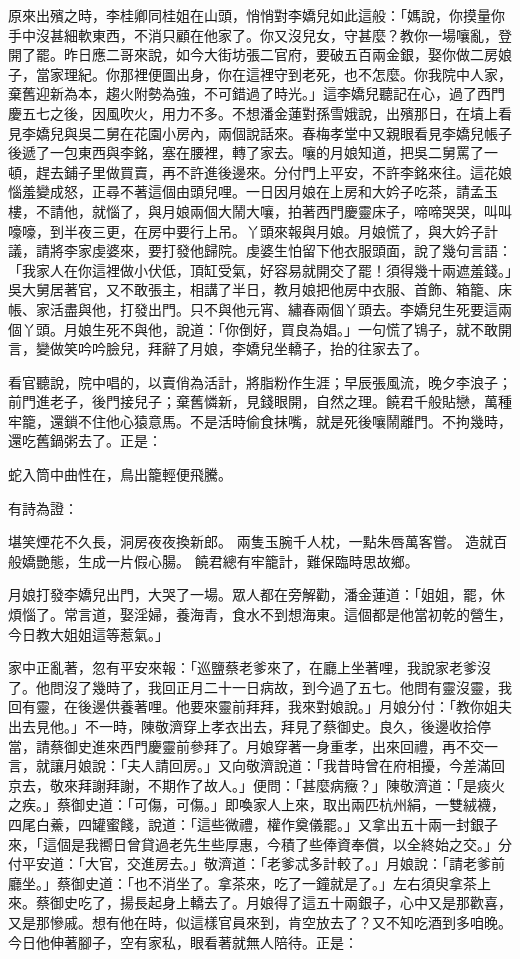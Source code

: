 原來出殯之時，李桂卿同桂姐在山頭，悄悄對李嬌兒如此這般：「媽說，你摸量你手中沒甚細軟東西，不消只顧在他家了。你又沒兒女，守甚麼？教你一場嚷亂，登開了罷。昨日應二哥來說，如今大街坊張二官府，要破五百兩金銀，娶你做二房娘子，當家理紀。你那裡便圖出身，你在這裡守到老死，也不怎麼。你我院中人家，棄舊迎新為本，趨火附勢為強，不可錯過了時光。」這李嬌兒聽記在心，過了西門慶五七之後，因風吹火，用力不多。不想潘金蓮對孫雪娥說，出殯那日，在墳上看見李嬌兒與吳二舅在花園小房內，兩個說話來。春梅孝堂中又親眼看見李嬌兒帳子後遞了一包東西與李銘，塞在腰裡，轉了家去。嚷的月娘知道，把吳二舅罵了一頓，趕去鋪子里做買賣，再不許進後邊來。分付門上平安，不許李銘來往。這花娘惱羞變成怒，正尋不著這個由頭兒哩。一日因月娘在上房和大妗子吃茶，請孟玉樓，不請他，就惱了，與月娘兩個大鬧大嚷，拍著西門慶靈床子，啼啼哭哭，叫叫嚎嚎，到半夜三更，在房中要行上吊。丫頭來報與月娘。月娘慌了，與大妗子計議，請將李家虔婆來，要打發他歸院。虔婆生怕留下他衣服頭面，說了幾句言語：「我家人在你這裡做小伏低，頂缸受氣，好容易就開交了罷！須得幾十兩遮羞錢。」吳大舅居著官，又不敢張主，相講了半日，教月娘把他房中衣服、首飾、箱籠、床帳、家活盡與他，打發出門。只不與他元宵、繡春兩個丫頭去。李嬌兒生死要這兩個丫頭。月娘生死不與他，說道：「你倒好，買良為娼。」一句慌了鴇子，就不敢開言，變做笑吟吟臉兒，拜辭了月娘，李嬌兒坐轎子，抬的往家去了。

看官聽說，院中唱的，以賣俏為活計，將脂粉作生涯；早辰張風流，晚夕李浪子；前門進老子，後門接兒子；棄舊憐新，見錢眼開，自然之理。饒君千般貼戀，萬種牢籠，還鎖不住他心猿意馬。不是活時偷食抹嘴，就是死後嚷鬧離門。不拘幾時，還吃舊鍋粥去了。正是：

蛇入筒中曲性在，鳥出籠輕便飛騰。

有詩為證：

堪笑煙花不久長，洞房夜夜換新郎。
兩隻玉腕千人枕，一點朱唇萬客嘗。
造就百般嬌艷態，生成一片假心腸。
饒君總有牢籠計，難保臨時思故鄉。

月娘打發李嬌兒出門，大哭了一場。眾人都在旁解勸，潘金蓮道：「姐姐，罷，休煩惱了。常言道，娶淫婦，養海青，食水不到想海東。這個都是他當初乾的營生，今日教大姐姐這等惹氣。」

家中正亂著，忽有平安來報：「巡鹽蔡老爹來了，在廳上坐著哩，我說家老爹沒了。他問沒了幾時了，我回正月二十一日病故，到今過了五七。他問有靈沒靈，我回有靈，在後邊供養著哩。他要來靈前拜拜，我來對娘說。」月娘分付：「教你姐夫出去見他。」不一時，陳敬濟穿上孝衣出去，拜見了蔡御史。良久，後邊收拾停當，請蔡御史進來西門慶靈前參拜了。月娘穿著一身重孝，出來回禮，再不交一言，就讓月娘說：「夫人請回房。」又向敬濟說道：「我昔時曾在府相擾，今差滿回京去，敬來拜謝拜謝，不期作了故人。」便問：「甚麼病癥？」陳敬濟道：「是痰火之疾。」蔡御史道：「可傷，可傷。」即喚家人上來，取出兩匹杭州絹，一雙絨襪，四尾白鯗，四罐蜜餞，說道：「這些微禮，權作奠儀罷。」又拿出五十兩一封銀子來，「這個是我嚮日曾貸過老先生些厚惠，今積了些俸資奉償，以全終始之交。」分付平安道：「大官，交進房去。」敬濟道：「老爹忒多計較了。」月娘說：「請老爹前廳坐。」蔡御史道：「也不消坐了。拿茶來，吃了一鐘就是了。」左右須臾拿茶上來。蔡御史吃了，揚長起身上轎去了。月娘得了這五十兩銀子，心中又是那歡喜，又是那慘戚。想有他在時，似這樣官員來到，肯空放去了？又不知吃酒到多咱晚。今日他伸著腳子，空有家私，眼看著就無人陪待。正是：

